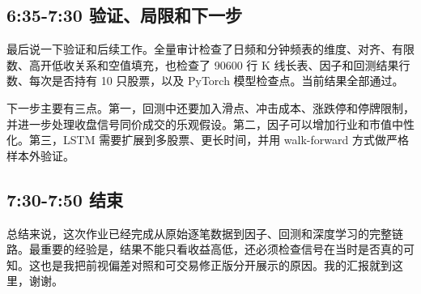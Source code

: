\documentclass[
]{article}
\begin{document}
\subsection{6:35-7:30
验证、局限和下一步}\label{ux9a8cux8bc1ux5c40ux9650ux548cux4e0bux4e00ux6b65}

最后说一下验证和后续工作。全量审计检查了日频和分钟频表的维度、对齐、有限数、高开低收关系和空值填充，也检查了
90600 行 K 线长表、因子和回测结果行数、每次是否持有 10 只股票，以及
PyTorch 模型检查点。当前结果全部通过。

下一步主要有三点。第一，回测中还要加入滑点、冲击成本、涨跌停和停牌限制，并进一步处理收盘信号同价成交的乐观假设。第二，因子可以增加行业和市值中性化。第三，LSTM
需要扩展到多股票、更长时间，并用 walk-forward 方式做严格样本外验证。

\subsection{7:30-7:50 结束}\label{ux7ed3ux675f}

总结来说，这次作业已经完成从原始逐笔数据到因子、回测和深度学习的完整链路。最重要的经验是，结果不能只看收益高低，还必须检查信号在当时是否真的可知。这也是我把前视偏差对照和可交易修正版分开展示的原因。我的汇报就到这里，谢谢。
\end{document}
